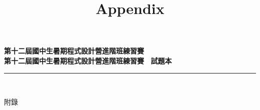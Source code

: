 \documentclass[a4paper]{article}
\title{Appendix}
\begin{document}
\begin{center}
\textbf{\huge 第十二屆國中生暑期程式設計營進階班練習賽}\\
\vspace{5mm}
\textbf{\huge 第十二屆國中生暑期程式設計營進階班練習賽 \ 試題本}\\
\vspace{10mm}
\rule{17cm}{2pt}\\
\vspace{5mm}

\huge 附錄\\
\end{center}

\fontsize{14pt}{20pt}\selectfont

\noindent
\end{document}
